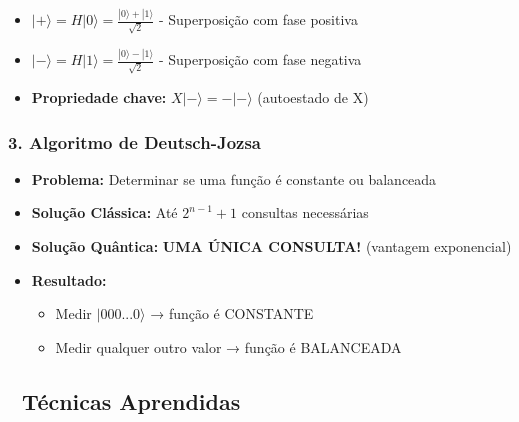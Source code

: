 \documentclass[
  brazilian,
]{report}
\providecommand{\tightlist}{%
  \setlength{\itemsep}{0pt}\setlength{\parskip}{0pt}}
\begin{document}
\begin{itemize}
\tightlist
\item
  \textbf{\(|+\rangle = H|0\rangle = \frac{|0\rangle + |1\rangle}{\sqrt{2}}\)}
  - Superposição com fase positiva
\item
  \textbf{\(|-\rangle = H|1\rangle = \frac{|0\rangle - |1\rangle}{\sqrt{2}}\)}
  - Superposição com fase negativa
\item
  \textbf{Propriedade chave:} \(X|-\rangle = -|-\rangle\) (autoestado de
  X)
\end{itemize}

\subsubsection{\texorpdfstring{3. \textbf{Algoritmo de
Deutsch-Jozsa}}{3. Algoritmo de Deutsch-Jozsa}}\label{algoritmo-de-deutsch-jozsa}

\begin{itemize}
\tightlist
\item
  \textbf{Problema:} Determinar se uma função é constante ou balanceada
\item
  \textbf{Solução Clássica:} Até \(2^{n-1} + 1\) consultas necessárias
\item
  \textbf{Solução Quântica:} \textbf{UMA ÚNICA CONSULTA!} (vantagem
  exponencial)
\item
  \textbf{Resultado:}

  \begin{itemize}
  \tightlist
  \item
    Medir \(|000...0\rangle\) → função é CONSTANTE
  \item
    Medir qualquer outro valor → função é BALANCEADA
  \end{itemize}
\end{itemize}

\subsection{🔬 Técnicas Aprendidas}\label{tuxe9cnicas-aprendidas}
\end{document}

